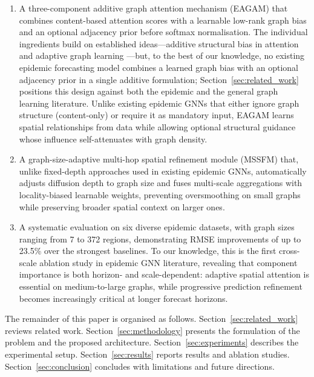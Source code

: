 \documentclass[final,1p,times]{elsarticle}
\begin{document}
\begin{enumerate}
  \item A three-component additive graph attention mechanism (EAGAM) that combines content-based attention scores with a learnable low-rank graph bias and an optional adjacency prior before softmax normalisation. The individual ingredients build on established ideas---additive structural bias in attention \cite{ying2021transformers, press2022train} and adaptive graph learning \cite{wu2020connecting, bai2020adaptive}---but, to the best of our knowledge, no existing epidemic forecasting model combines a learned graph bias with an optional adjacency prior in a single additive formulation; Section~\ref{sec:related_work} positions this design against both the epidemic and the general graph learning literature. Unlike existing epidemic GNNs that either ignore graph structure (content-only) or require it as mandatory input, EAGAM learns spatial relationships from data while allowing optional structural guidance whose influence self-attenuates with graph density.

  \item A graph-size-adaptive multi-hop spatial refinement module (MSSFM) that, unlike fixed-depth approaches used in existing epidemic GNNs, automatically adjusts diffusion depth to graph size and fuses multi-scale aggregations with locality-biased learnable weights, preventing oversmoothing on small graphs while preserving broader spatial context on larger ones.

  \item A systematic evaluation on six diverse epidemic datasets, with graph sizes ranging from 7 to 372 regions, demonstrating RMSE improvements of up to 23.5\% over the strongest baselines. To our knowledge, this is the first cross-scale ablation study in epidemic GNN literature, revealing that component importance is both horizon- and scale-dependent: adaptive spatial attention is essential on medium-to-large graphs, while progressive prediction refinement becomes increasingly critical at longer forecast horizons.
\end{enumerate}

The remainder of this paper is organised as follows. Section~\ref{sec:related_work} reviews related work. Section~\ref{sec:methodology} presents the formulation of the problem and the proposed architecture. Section~\ref{sec:experiments} describes the experimental setup. Section~\ref{sec:results} reports results and ablation studies. Section~\ref{sec:conclusion} concludes with limitations and future directions.
\end{document}
